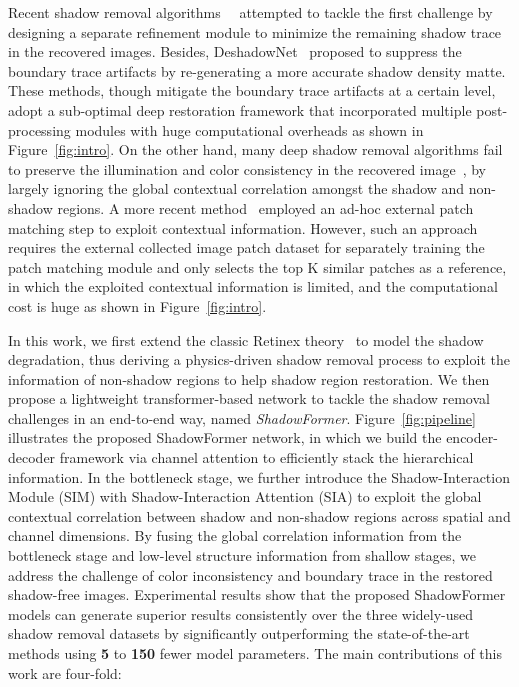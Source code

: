 \documentclass[letterpaper]{article} \usepackage{aaai23}  \usepackage{times}  \usepackage{helvet}  \usepackage{courier}  \usepackage[hyphens]{url}  \usepackage{graphicx} \urlstyle{rm} \def\UrlFont{\rm}  \usepackage{natbib}  \usepackage{caption} \frenchspacing  \setlength{\pdfpagewidth}{8.5in} \setlength{\pdfpageheight}{11in} \usepackage{algorithm}
\begin{document}
Recent shadow removal algorithms~~\cite{le2019shadow,fu2021auto} attempted to tackle the first challenge by designing a separate refinement module to minimize the remaining shadow trace in the recovered images.
Besides, DeshadowNet~\cite{qu2017deshadownet} proposed to suppress the boundary trace artifacts by re-generating a more accurate shadow density matte.
These methods, though mitigate the boundary trace artifacts at a certain level, adopt a sub-optimal deep restoration framework that incorporated multiple post-processing modules with huge computational overheads as shown in Figure~\ref{fig:intro}. 
On the other hand, many deep shadow removal algorithms fail to preserve the illumination and color consistency in the recovered image~\cite{qu2017deshadownet,le2019shadow,fu2021auto}, by largely ignoring the global contextual correlation amongst the shadow and non-shadow regions.
A more recent method~\cite{chen2021canet} employed an ad-hoc external patch matching step to exploit contextual information. 
However, such an approach requires the external collected image patch dataset for separately training the patch matching module and only selects the top K similar patches as a reference, in which the exploited contextual information is limited, and the computational cost is huge as shown in Figure~\ref{fig:intro}. 


In this work, we first extend the classic Retinex theory~\cite{land1977retinex} to model the shadow degradation, thus deriving a physics-driven shadow removal process to exploit the information of non-shadow regions to help shadow region restoration.
We then propose a lightweight transformer-based network to tackle the shadow removal challenges in an end-to-end way, named \textit{ShadowFormer}. 
Figure~\ref{fig:pipeline} illustrates the proposed ShadowFormer network, in which we build the encoder-decoder framework via channel attention to efficiently stack the hierarchical information.
In the bottleneck stage, we further introduce the Shadow-Interaction Module (SIM) with Shadow-Interaction Attention (SIA) to 
exploit the global contextual correlation between shadow and non-shadow regions across spatial and channel dimensions.
By fusing the global correlation information from the bottleneck stage and low-level structure information from shallow stages, we address the challenge of color inconsistency and boundary trace in the restored shadow-free images.
Experimental results show that the proposed ShadowFormer models can generate superior results consistently over the three widely-used shadow removal datasets by significantly outperforming the state-of-the-art methods using \textbf{5} to \textbf{150} fewer model parameters.
The main contributions of this work are four-fold:
\end{document}
